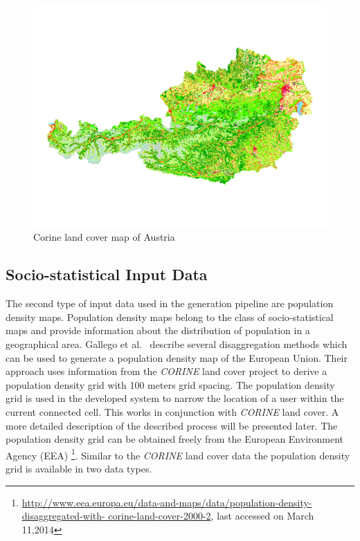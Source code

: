 \documentclass[master,english]{hgbthesis}
\begin{document}
\begin{figure}
	\centering
	\includegraphics[width=\linewidth]{./images/clc_austria.png}
	\caption{Corine land cover map of Austria}
	\label{fig:clc_austria}
\end{figure}
\subsection{Socio-statistical Input Data}
The second type of input data used in the generation pipeline are population density maps. Population density maps belong to the class of socio-statistical maps and provide information about the distribution of population in a geographical area. Gallego et al.~\cite{Gallego2010,Gallego2011} describe several disaggregation methods which can be used to generate a population density map of the European Union.
Their approach uses information from the \emph{CORINE} land cover project to derive a population density grid with 100 meters grid spacing. The population density grid is used in the developed system to narrow the location of a user within the current connected cell. This works in conjunction with \emph{CORINE} land cover. A more detailed description of the described process will be presented later.
The population density grid can be obtained freely from the European Environment Agency (EEA) \footnote{\url{http://www.eea.europa.eu/data-and-maps/data/population-density-disaggregated-with-
	corine-land-cover-2000-2}, last accessed on March 11,2014}. Similar to the \emph{CORINE} land cover data the population density grid is available in two data types.
\end{document}
